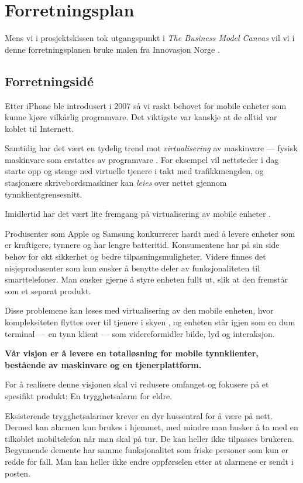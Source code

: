\chapter{Forretningsplan}

Mens vi i prosjektskissen tok utgangspunkt i \textit{The Business Model Canvas}
\cite{osterwalder} vil vi i denne forretningsplanen bruke malen fra Innovasjon
Norge \cite{innovasjon.norge}.

\section{Forretningsidé}

Etter iPhone ble introdusert i 2007 så vi raskt behovet for mobile enheter som
kunne kjøre vilkårlig programvare. Det viktigste var kanskje at de alltid var
koblet til Internett.

Samtidig har det vært en tydelig trend mot \textit{virtualisering} av
maskinvare --- fysisk maskinvare som erstattes av programvare
\cite{2006.virtualization.trends}.  For eksempel vil nettsteder i dag starte
opp og stenge ned virtuelle tjenere i takt med trafikkmengden, og stasjonære
skrivebordsmaskiner kan \textit{leies} over nettet gjennom
tynnklientgrensesnitt.

Imidlertid har det vært lite fremgang på virtualisering av mobile enheter
\cite{embedded.virtualization}.

Produsenter som Apple og Samsung konkurrerer hardt med å levere enheter som er
kraftigere, tynnere og har lengre batteritid.
%
Konsumentene har på sin side behov for økt sikkerhet og bedre
tilpasningsmuligheter.
%
Videre finnes det nisjeprodusenter som kun ønsker å benytte deler av
funksjonaliteten til smarttelefoner.
%
Man ønsker gjerne å styre enheten fullt ut, slik at den fremstår som et separat
produkt.

Disse problemene kan løses med virtualisering av den mobile enheten, hvor
kompleksiteten flyttes over til tjenere i skyen \cite{mobil.virt.fordel}, og
enheten står igjen som en dum terminal --- en tynn klient --- som
videreformidler bilde, lyd og interaksjon.

\textbf{Vår visjon er å levere en totalløsning for mobile tynnklienter,
bestående av maskinvare og en tjenerplattform.}

For å realisere denne visjonen skal vi redusere omfanget og fokusere på et
spesifikt produkt: En trygghetsalarm for eldre.

Eksisterende trygghetsalarmer krever en dyr hussentral for å være på nett.
Dermed kan alarmen kun brukes i hjemmet, med mindre man husker å ta med en
tilkoblet mobiltelefon når man skal på tur. De kan heller ikke tilpasses
brukeren. Begynnende demente har samme funksjonalitet som friske personer som
kun er redde for fall. Man kan heller ikke endre oppførselen etter at alarmene
er sendt i posten.

